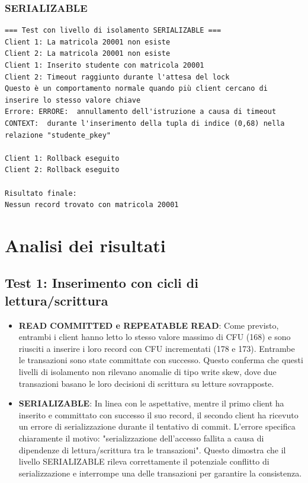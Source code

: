 \documentclass[a4paper,12pt]{report}
\begin{document}
\subsection{SERIALIZABLE}
\begin{verbatim}
=== Test con livello di isolamento SERIALIZABLE ===
Client 1: La matricola 20001 non esiste
Client 2: La matricola 20001 non esiste
Client 1: Inserito studente con matricola 20001
Client 2: Timeout raggiunto durante l'attesa del lock
Questo è un comportamento normale quando più client cercano di inserire lo stesso valore chiave
Errore: ERRORE:  annullamento dell'istruzione a causa di timeout
CONTEXT:  durante l'inserimento della tupla di indice (0,68) nella relazione "studente_pkey"

Client 1: Rollback eseguito
Client 2: Rollback eseguito

Risultato finale:
Nessun record trovato con matricola 20001
\end{verbatim}

\chapter{Analisi dei risultati}

\section{Test 1: Inserimento con cicli di lettura/scrittura}
\begin{itemize}
    \item \textbf{READ COMMITTED e REPEATABLE READ}: Come previsto, entrambi i client hanno letto lo stesso valore massimo di CFU (168) e sono riusciti a inserire i loro record con CFU incrementati (178 e 173). Entrambe le transazioni sono state committate con successo. Questo conferma che questi livelli di isolamento non rilevano anomalie di tipo write skew, dove due transazioni basano le loro decisioni di scrittura su letture sovrapposte.
    
    \item \textbf{SERIALIZABLE}: In linea con le aspettative, mentre il primo client ha inserito e committato con successo il suo record, il secondo client ha ricevuto un errore di serializzazione durante il tentativo di commit. L'errore specifica chiaramente il motivo: "serializzazione dell'accesso fallita a causa di dipendenze di lettura/scrittura tra le transazioni". Questo dimostra che il livello SERIALIZABLE rileva correttamente il potenziale conflitto di serializzazione e interrompe una delle transazioni per garantire la consistenza.
\end{itemize}
\end{document}
